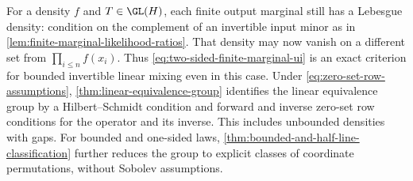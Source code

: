 For a density \(f\) and \(T\in\GL(H)\), each finite output
marginal still has a Lebesgue density: condition on the complement
of an invertible input minor as in
\cref{lem:finite-marginal-likelihood-ratios}.
That density may now vanish on a different set from
\(\prod_{i\leq n}f(x_i)\).
Thus \eqref{eq:two-sided-finite-marginal-ui} is an exact criterion for
bounded invertible linear mixing even in this case.
Under \eqref{eq:zero-set-row-assumptions},
\cref{thm:linear-equivalence-group} identifies the linear equivalence
group by a Hilbert--Schmidt condition and forward and inverse zero-set row conditions for the
operator and its inverse.  This includes unbounded densities with gaps.
For bounded and one-sided laws,
\cref{thm:bounded-and-half-line-classification} further reduces the group to
explicit classes of coordinate permutations, without Sobolev assumptions.
